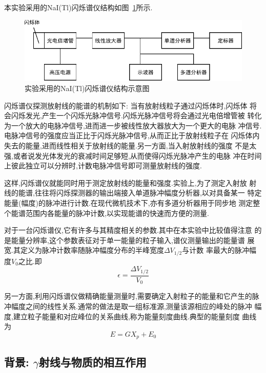 \documentclass[aps,pre,12pt,preprint,onecolumn,showpacs,showkeys]{revtex4-1}
\begin{document}
本实验采用的NaI(Tl)闪烁谱仪结构如图~\ref{fig:ins}所示.

\begin{figure}[htbp]
  \centering
\includegraphics[width=\textwidth]{graph.pdf}
\caption{\label{fig:ins}%
实验采用的NaI(Tl)闪烁谱仪结构示意图}
\end{figure}

闪烁谱仪探测放射线的能谱的机制如下: 当有放射线粒子通过闪烁体时,闪烁体
将会闪烁发光,产生一个闪烁光脉冲信号.闪烁光脉冲信号将会通过光电倍增管被
转化为一个放大的电脉冲信号,进而进一步被线性放大器放大为一个更大的电脉
冲信号.电脉冲信号的强度应当正比于闪烁光脉冲信号,从而正比于放射线粒子在
闪烁体内失去的能量,进而线性相关于放射线的能量.另一方面,当入射放射线的强度
不是太强,或者说发光体发光的衰减时间足够短,从而使得闪烁光脉冲产生的电脉
冲在时间上彼此独立可以分辨时,计数电脉冲信号即可测量放射线的强度.

这样,闪烁谱仪就能同时用于测定放射线的能量和强度.实验上,为了测定入射放
射线的能谱,往往将闪烁探测器的输出端接入单道脉冲幅度分析器,以对具备某一
特定能量(幅度)的脉冲进行计数.在现代微机技术下,亦有多道分析器用于同步地
测定整个能谱范围内各能量的脉冲计数,以实现能谱的快速而方便的测量.\cite{book}

对于一台闪烁谱仪,它有许多与其精度相关的参数.其中在本实验中比较值得注意
的是能量分辨率,这个参数表征对于单一能量的粒子输入,谱仪测量输出的能量谱
展宽.其定义为脉冲计数率随脉冲幅度分布的半峰宽度$\Delta V_{1/2}$与计数
率最大的脉冲幅度$V_0$之比.即
\begin{equation}
  \epsilon = \frac{\Delta V_{1/2}}{V_0}
\end{equation}

另一方面,利用闪烁谱仪做精确能量测量时,需要确定入射粒子的能量和它产生的脉
冲幅度之间的线性关系.通常的做法是取一组标准源,测量该源相应的峰处的脉冲
幅度,建立粒子能量和对应峰位的关系曲线,称为能量刻度曲线.典型的能量刻度
曲线为
\begin{equation}
  E = GX_p + E_0
\end{equation}

\subsection{背景: $\gamma$射线与物质的相互作用}
\end{document}
